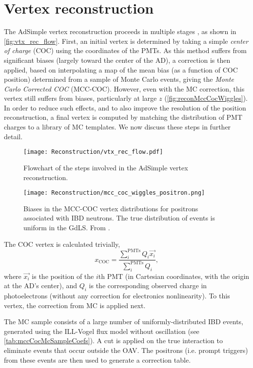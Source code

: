 \documentclass[../thesis.tex]{subfiles}
\begin{document}
\section{Vertex reconstruction}
\label{sec:reconVertex}

The AdSimple vertex reconstruction proceeds in multiple stages \cite{adsimple1,adsimple2}, as shown in \autoref{fig:vtx_rec_flow}. First, an initial vertex is determined by taking a simple \emph{center of charge} (COC) using the coordinates of the PMTs. As this method suffers from significant biases (largely toward the center of the AD), a correction is then applied, based on interpolating a map of the mean bias (as a function of COC position) determined from a sample of Monte Carlo events, giving the \emph{Monte Carlo Corrected COC} (MCC-COC). However, even with the MC correction, this vertex still suffers from biases, particularly at large $z$ (\autoref{fig:reconMccCocWiggles}). In order to reduce such effects, and to also improve the resolution of the position reconstruction, a final vertex is computed by matching the distribution of PMT charges to a library of MC templates. We now discuss these steps in further detail. 

\begin{figure}[h]
  \texttt{[image: Reconstruction/vtx\_rec\_flow.pdf]}
  \caption{Flowchart of the steps involved in the AdSimple vertex reconstruction.}
  \label{fig:vtx_rec_flow}
\end{figure}


\begin{figure}[h]
  \texttt{[image: Reconstruction/mcc\_coc\_wiggles\_positron.png]}
  \caption{Biases in the MCC-COC vertex distributions for positrons associated with IBD neutrons. The true distribution of events is uniform in the GdLS. From \cite{adsimple1}.}
  \label{fig:reconMccCocWiggles}
\end{figure}

The COC vertex is calculated trivially,
\begin{equation}
  x_{\mathrm{COC}} = \frac{\sum_{i}^{\mathrm{PMTs}} Q_i \vec{x_i}}{\sum_i^{\mathrm{PMTs}} Q_i},
\end{equation}
where $\vec{x_i}$ is the position of the $i$th PMT (in Cartesian coordinates, with the origin at the AD's center), and $Q_i$ is the corresponding observed charge in photoelectrons (without any correction for electronics nonlinearity). To this vertex, the correction from MC is applied next.

The MC sample consists of a large number of uniformly-distributed IBD events, generated using the ILL-Vogel flux model without oscillation (see \autoref{tab:mccCocMcSampleCoefs}). A cut is applied on the true interaction to eliminate events that occur outside the OAV. The positrons (i.e. prompt triggers) from these events are then used to generate a correction table.
\end{document}
